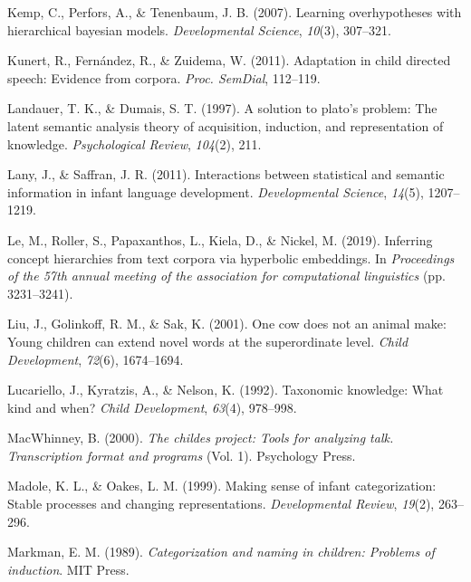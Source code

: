\documentclass[english,,man]{apa6}
\begin{document}
\leavevmode\hypertarget{ref-kemp2007learning}{}%
Kemp, C., Perfors, A., \& Tenenbaum, J. B. (2007). Learning overhypotheses with hierarchical bayesian models. \emph{Developmental Science}, \emph{10}(3), 307--321.

\leavevmode\hypertarget{ref-kunert2011adaptation}{}%
Kunert, R., Fernández, R., \& Zuidema, W. (2011). Adaptation in child directed speech: Evidence from corpora. \emph{Proc. SemDial}, 112--119.

\leavevmode\hypertarget{ref-landauer1997solution}{}%
Landauer, T. K., \& Dumais, S. T. (1997). A solution to plato's problem: The latent semantic analysis theory of acquisition, induction, and representation of knowledge. \emph{Psychological Review}, \emph{104}(2), 211.

\leavevmode\hypertarget{ref-lany2011}{}%
Lany, J., \& Saffran, J. R. (2011). Interactions between statistical and semantic information in infant language development. \emph{Developmental Science}, \emph{14}(5), 1207--1219.

\leavevmode\hypertarget{ref-le2019inferring}{}%
Le, M., Roller, S., Papaxanthos, L., Kiela, D., \& Nickel, M. (2019). Inferring concept hierarchies from text corpora via hyperbolic embeddings. In \emph{Proceedings of the 57th annual meeting of the association for computational linguistics} (pp. 3231--3241).

\leavevmode\hypertarget{ref-liu2001}{}%
Liu, J., Golinkoff, R. M., \& Sak, K. (2001). One cow does not an animal make: Young children can extend novel words at the superordinate level. \emph{Child Development}, \emph{72}(6), 1674--1694.

\leavevmode\hypertarget{ref-lucariello1992taxonomic}{}%
Lucariello, J., Kyratzis, A., \& Nelson, K. (1992). Taxonomic knowledge: What kind and when? \emph{Child Development}, \emph{63}(4), 978--998.

\leavevmode\hypertarget{ref-macwhinney2000}{}%
MacWhinney, B. (2000). \emph{The childes project: Tools for analyzing talk. Transcription format and programs} (Vol. 1). Psychology Press.

\leavevmode\hypertarget{ref-madole1999}{}%
Madole, K. L., \& Oakes, L. M. (1999). Making sense of infant categorization: Stable processes and changing representations. \emph{Developmental Review}, \emph{19}(2), 263--296.

\leavevmode\hypertarget{ref-markman1989}{}%
Markman, E. M. (1989). \emph{Categorization and naming in children: Problems of induction}. MIT Press.
\end{document}
